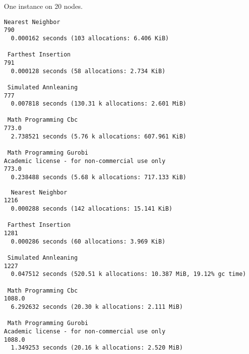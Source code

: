   
  One instance on 20 nodes.
  \begin{verbatim}
Nearest Neighbor
790
  0.000162 seconds (103 allocations: 6.406 KiB)

 Farthest Insertion
791
  0.000128 seconds (58 allocations: 2.734 KiB)

 Simulated Annleaning
777
  0.007818 seconds (130.31 k allocations: 2.601 MiB)

 Math Programming Cbc
773.0
  2.738521 seconds (5.76 k allocations: 607.961 KiB)

 Math Programming Gurobi
Academic license - for non-commercial use only
773.0
  0.238488 seconds (5.68 k allocations: 717.133 KiB)
  \end{verbatim}
  
  \begin{verbatim}
  Nearest Neighbor
1216
  0.000288 seconds (142 allocations: 15.141 KiB)

 Farthest Insertion
1281
  0.000286 seconds (60 allocations: 3.969 KiB)

 Simulated Annleaning
1227
  0.047512 seconds (520.51 k allocations: 10.387 MiB, 19.12% gc time)

 Math Programming Cbc
1088.0
  6.292632 seconds (20.30 k allocations: 2.111 MiB)

 Math Programming Gurobi
Academic license - for non-commercial use only
1088.0
  1.349253 seconds (20.16 k allocations: 2.520 MiB)
  \end{verbatim}
